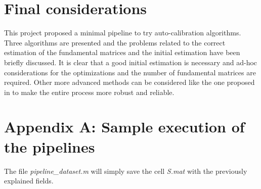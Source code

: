 \documentclass[11pt]{article}
\begin{document}
\section{Final considerations}
This project proposed a minimal pipeline to try auto-calibration algorithms. Three algorithms are presented and the problems related to the correct estimation of the fundamental matrices and the initial estimation have been briefly discussed. It is clear that a good initial estimation is necessary and ad-hoc considerations for the optimizations and the number of fundamental matrices are required. Other more advanced methods can be considered like the one proposed in \cite{Gherardi10} to make the entire process more robust and reliable. 

\section{Appendix A: Sample execution of the pipelines}
\noindent The file \textit{pipeline\_dataset.m} will simply save the cell \textit{S.mat} with the previously explained fields.
\end{document}
